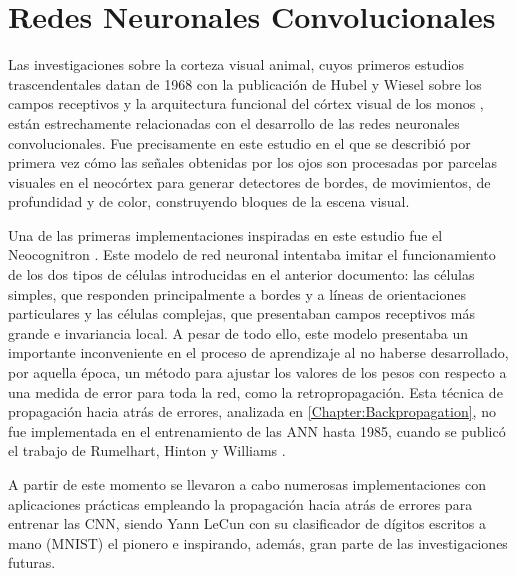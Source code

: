 \section{Redes Neuronales Convolucionales} \label{Chapter:CNN}

Las investigaciones sobre la corteza visual animal, cuyos primeros estudios trascendentales datan de 1968 con la publicación de Hubel y Wiesel sobre los campos receptivos y la arquitectura funcional del córtex visual de los monos \cite{Hubel}, están estrechamente relacionadas con el desarrollo de las redes neuronales convolucionales. Fue precisamente en este estudio en el que se describió por primera vez cómo las señales obtenidas por los ojos son procesadas por parcelas visuales en el neocórtex para generar detectores de bordes, de movimientos, de profundidad y de color, construyendo bloques de la escena visual.

Una de las primeras implementaciones inspiradas en este estudio fue el Neocognitron \cite{Neocognitron}. Este modelo de red neuronal intentaba imitar el funcionamiento de los dos tipos de células introducidas en el anterior documento: las células simples, que responden principalmente a bordes y a líneas de orientaciones particulares y las células complejas, que presentaban campos receptivos más grande e invariancia local. A pesar de todo ello, este modelo presentaba un importante inconveniente en el proceso de aprendizaje al no haberse desarrollado, por aquella época, un método para ajustar los valores de los pesos con respecto a una medida de error para toda la red, como la retropropagación. Esta técnica de propagación hacia atrás de errores, analizada en \autoref{Chapter:Backpropagation}, no fue implementada en el entrenamiento de las ANN hasta 1985, cuando se publicó el trabajo de Rumelhart, Hinton y Williams \cite{Rumelhart}.

A partir de este momento se llevaron a cabo numerosas implementaciones con aplicaciones prácticas empleando la propagación hacia atrás de errores para entrenar las CNN, siendo Yann LeCun con su clasificador de dígitos escritos a mano (MNIST) \cite{MNIST} el pionero e inspirando, además, gran parte de las investigaciones futuras.

